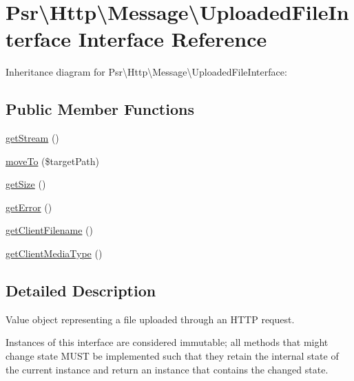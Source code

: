 \hypertarget{interfacePsr_1_1Http_1_1Message_1_1UploadedFileInterface}{}\section{Psr\textbackslash{}Http\textbackslash{}Message\textbackslash{}Uploaded\+File\+Interface Interface Reference}
\label{interfacePsr_1_1Http_1_1Message_1_1UploadedFileInterface}


Inheritance diagram for Psr\textbackslash{}Http\textbackslash{}Message\textbackslash{}Uploaded\+File\+Interface\+:
\subsection*{Public Member Functions}
\begin{DoxyCompactItemize}
\item 
\hyperlink{interfacePsr_1_1Http_1_1Message_1_1UploadedFileInterface_a342c7814f65c2b256dc525bc3063d662}{get\+Stream} ()
\item 
\hyperlink{interfacePsr_1_1Http_1_1Message_1_1UploadedFileInterface_aac862c26ca280245c0fb197d0266fdf4}{move\+To} (\$target\+Path)
\item 
\hyperlink{interfacePsr_1_1Http_1_1Message_1_1UploadedFileInterface_a6fabb21af5c4053e1d561018a5d30051}{get\+Size} ()
\item 
\hyperlink{interfacePsr_1_1Http_1_1Message_1_1UploadedFileInterface_a1c08f48bd2c0b20b37dfadf6f2c992e9}{get\+Error} ()
\item 
\hyperlink{interfacePsr_1_1Http_1_1Message_1_1UploadedFileInterface_ac303b01505ed2b5fb175ff81fbde666d}{get\+Client\+Filename} ()
\item 
\hyperlink{interfacePsr_1_1Http_1_1Message_1_1UploadedFileInterface_a5996e9ed494dd17fa7839de56995feee}{get\+Client\+Media\+Type} ()
\end{DoxyCompactItemize}


\subsection{Detailed Description}
Value object representing a file uploaded through an H\+T\+TP request.

Instances of this interface are considered immutable; all methods that might change state M\+U\+ST be implemented such that they retain the internal state of the current instance and return an instance that contains the changed state. 

